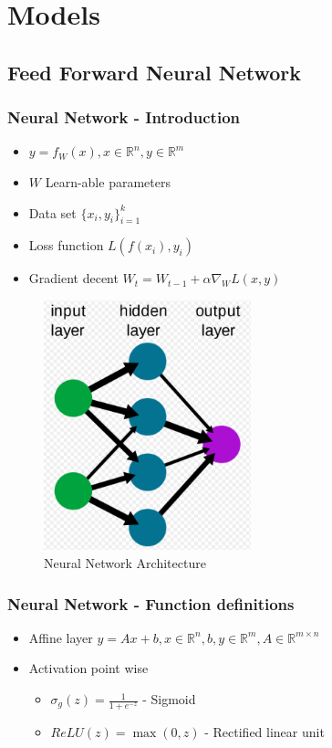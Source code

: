 \documentclass{article}
\begin{document}
\newpage

\section{Models}
\subsection{Feed Forward Neural Network}

\subsubsection{Neural Network - Introduction}
\begin{itemize}
	\item $y = f_{W}(x), x \in \mathbb{R}^n, y \in \mathbb{R}^m$ 
	\item $W$ Learn-able parameters
	\item Data set $\{x_i, y_i \}_{i=1}^k$
	\item Loss function $L(f(x_i), y_i)$
	\item Gradient decent $W_t = W_{t-1} + \alpha \nabla_{W}L(x,y) $ 
\end{itemize}

\begin{figure}[H]\centering\includegraphics[width=6cm]{FFNN.png}\caption{Neural Network Architecture}\end{figure}

\newpage
\subsubsection{Neural Network - Function definitions}
\begin{itemize}
	\item Affine layer $y = Ax + b , x \in \mathbb{R}^n, b, y \in \mathbb{R}^m, A \in \mathbb{R}^{m \times n}$
	\item Activation point wise
	\begin{itemize}
		\item $\sigma_g(z) = \frac{1}{1+e^{-z}}$ - Sigmoid 
		\item $ReLU(z) = \max(0, z)$  - Rectified linear unit
	\end{itemize}	
\end{itemize}
\end{document}
